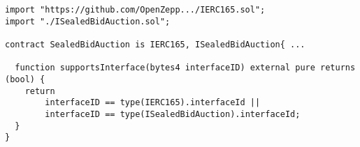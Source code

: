 \begin{lstlisting}[language=Solidity]
import "https://github.com/OpenZepp.../IERC165.sol";
import "./ISealedBidAuction.sol";

contract SealedBidAuction is IERC165, ISealedBidAuction{ ...

  function supportsInterface(bytes4 interfaceID) external pure returns (bool) {
    return
        interfaceID == type(IERC165).interfaceId ||
        interfaceID == type(ISealedBidAuction).interfaceId;
  }
}
\end{lstlisting}
